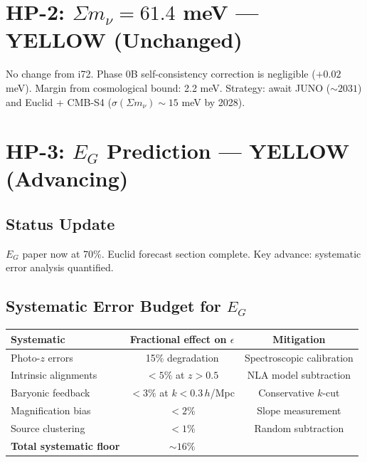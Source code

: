 \documentclass[11pt,a4paper]{article}
\begin{document}
\section{HP-2: $\Sigma m_\nu = 61.4$ meV --- YELLOW (Unchanged)}

No change from i72. Phase 0B self-consistency correction is negligible ($+0.02$ meV). Margin from cosmological bound: 2.2 meV. Strategy: await JUNO ($\sim 2031$) and Euclid + CMB-S4 ($\sigma(\Sigma m_\nu) \sim 15$ meV by 2028).

\section{HP-3: $E_G$ Prediction --- YELLOW (Advancing)}

\subsection{Status Update}
$E_G$ paper now at 70\%. Euclid forecast section complete. Key advance: systematic error analysis quantified.

\subsection{Systematic Error Budget for $E_G$}
\begin{center}
\begin{tabular}{lcc}
\toprule
\textbf{Systematic} & \textbf{Fractional effect on $\epsilon$} & \textbf{Mitigation} \\
\midrule
Photo-$z$ errors & 15\% degradation & Spectroscopic calibration \\
Intrinsic alignments & $< 5\%$ at $z > 0.5$ & NLA model subtraction \\
Baryonic feedback & $< 3\%$ at $k < 0.3\,h$/Mpc & Conservative $k$-cut \\
Magnification bias & $< 2\%$ & Slope measurement \\
Source clustering & $< 1\%$ & Random subtraction \\
\midrule
\textbf{Total systematic floor} & $\sim 16\%$ & \\
\bottomrule
\end{tabular}
\end{center}
\end{document}
